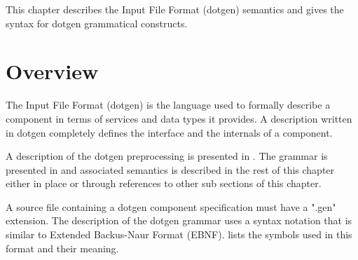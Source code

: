 %
%
%
%
%

This chapter describes the \GenoM{} Input File Format (dotgen) semantics and
gives the syntax for dotgen grammatical constructs.

\section{Overview}

The  \GenoM{} Input  File  Format (dotgen)  is  the language  used to  formally
describe a \GenoM{} component in terms  of services and data types it provides.
A  description written  in  dotgen  completely defines  the  interface and  the
internals of a component.

A    description    of   the    dotgen    preprocessing    is   presented    in
. The grammar is presented
in        and   associated
semantics is described  in the rest of this chapter either  in place or through
references to other sub sections of this chapter.

A source  file containing a dotgen  component specification must  have a ".gen"
extension. The description of the dotgen grammar uses a syntax notation that is
similar        to       Extended        Backus-Naur        Format       (EBNF).
  lists  the  symbols used  in
this format and their meaning.

